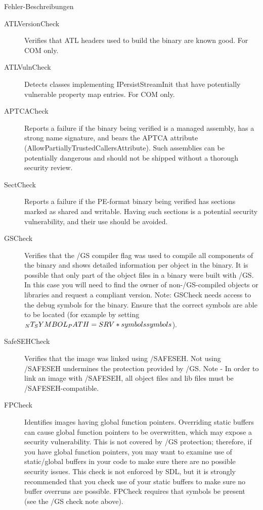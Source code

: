 Fehler-Beschreibungen
\begin{description}
	\item[ATLVersionCheck] Verifies that ATL headers used to build the binary are known good. For COM only.
	\item[ATLVulnCheck]  Detects classes implementing IPersistStreamInit that have potentially vulnerable property map entries. For COM only.
	\item[APTCACheck]  Reports a failure if the binary being verified is a managed assembly, has a strong name signature, and bears the APTCA attribute (AllowPartiallyTrustedCallersAttribute). Such assemblies can be potentially dangerous and should not be shipped without a thorough security review.
	\item[SectCheck] Reports a failure if the PE-format binary being verified has sections marked as shared and writable. Having such sections is a potential security vulnerability, and their use should be avoided.
	\item[GSCheck] Verifies that the /GS compiler flag was used to compile all components of the binary and shows detailed information per object in the binary. It is possible that only part of the object files in a binary were built with /GS. In this case you will need to find the owner of non-/GS-compiled objects or libraries and request a compliant version. Note: GSCheck needs access to the debug symbols for the binary. Ensure that the correct symbols are able to be located 
	(for example by setting $_NT_SYMBOL_PATH=SRV*\\symbols\\symbols$).
	\item[SafeSEHCheck]  Verifies that the image was linked using /SAFESEH. Not using /SAFESEH undermines the protection provided by /GS. Note - In order to link an image with /SAFESEH, all object files and lib files must be /SAFESEH-compatible.
	\item[FPCheck] Identifies images having global function pointers. Overriding static buffers can cause global function pointers to be overwritten, which may expose a security vulnerability. This is not covered by /GS protection; therefore, if you have global function pointers, you may want to examine use of static/global buffers in your code to make sure there are no possible security issues. This check is not enforced by SDL, but it is strongly recommended that you check use of your static buffers to make sure no buffer overruns are possible. FPCheck requires that symbols be present (see the /GS check note above).

\end{description}
